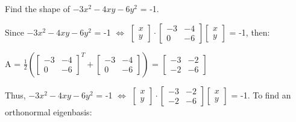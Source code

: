     \vspace{0.5cm}



    \begin{example}
        Find the shape of $-3x^2 - 4xy - 6y^2$ = -1.
    \end{example}

    \begin{tbox}
        Since
        $-3x^2 - 4xy - 6y^2$ = -1
        \hspace{0.5cm}
        $\Leftrightarrow$
        \hspace{0.5cm}
        \scriptsize
        $\begin{bmatrix}
            x \\
            y
        \end{bmatrix}
        \cdot
        \begin{bmatrix}
            -3 & -4 \\
            0 & -6
        \end{bmatrix}
        \begin{bmatrix}
            x \\
            y
        \end{bmatrix}$
        \normalsize
        = -1,
        then:

        \hspace{0.5cm}
        A =
        \scriptsize
        $\frac{1}{2}(\begin{bmatrix}
            -3 & -4 \\
            0 & -6
        \end{bmatrix}^T +
        \begin{bmatrix}
            -3 & -4 \\
            0 & -6
        \end{bmatrix})$ =
        $\begin{bmatrix}
            -3 & -2 \\
            -2 & -6
        \end{bmatrix}$
        \normalsize

        Thus,
        $-3x^2 - 4xy - 6y^2$ = -1
        \hspace{0.5cm}
        $\Leftrightarrow$
        \hspace{0.5cm}
        \scriptsize
        $\begin{bmatrix}
            x \\
            y
        \end{bmatrix}
        \cdot
        \begin{bmatrix}
            -3 & -2 \\
            -2 & -6
        \end{bmatrix}
        \begin{bmatrix}
            x \\
            y
        \end{bmatrix}$
        \normalsize
        = -1.
        To find an orthonormal eigenbasis:


\end{tbox}
